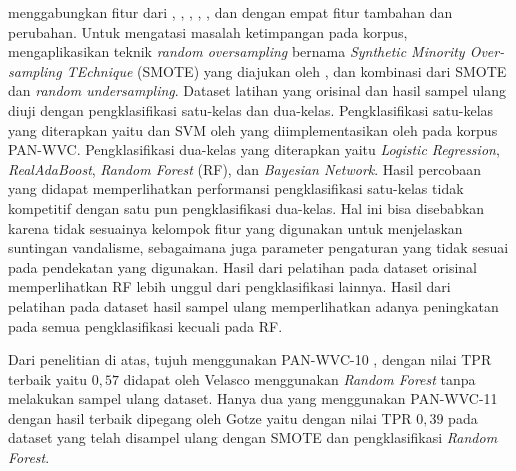\textcite{gotze2014advanced} menggabungkan fitur dari
\textcite{adler2011wikipedia},
\textcite{javanmardi2011vandalism},
\textcite{mola2012wikipedia},
\textcite{potthast2008automatic},
\textcite{wang2010got}, dan
\textcite{west2011multilingual} dengan empat fitur tambahan dan perubahan.
Untuk mengatasi masalah ketimpangan pada korpus,
\textcite{gotze2014advanced}
mengaplikasikan teknik
\textit{random oversampling}
bernama
\textit{Synthetic Minority Over-sampling TEchnique} (SMOTE)
yang diajukan oleh
\textcite{chawla2002smote},
dan kombinasi dari SMOTE dan
\textit{random undersampling}.
Dataset latihan yang orisinal dan hasil sampel ulang diuji dengan
pengklasifikasi satu-kelas dan dua-kelas.
Pengklasifikasi satu-kelas yang diterapkan yaitu
\textcite{hempstalk2008one}
dan SVM oleh
\textcite{scholkopf1999support}
yang diimplementasikan oleh
\textcite{chang2011libsvm}
pada korpus PAN-WVC.
Pengklasifikasi dua-kelas yang diterapkan yaitu
\textit{Logistic Regression},
\textit{RealAdaBoost},
\textit{Random Forest} (RF), dan
\textit{Bayesian Network}.
Hasil percobaan yang didapat memperlihatkan performansi pengklasifikasi
satu-kelas tidak kompetitif dengan satu pun pengklasifikasi dua-kelas.
Hal ini bisa disebabkan karena tidak sesuainya kelompok fitur yang digunakan
untuk menjelaskan suntingan vandalisme, sebagaimana juga parameter pengaturan
yang tidak sesuai pada pendekatan yang digunakan.
Hasil dari pelatihan pada dataset orisinal memperlihatkan RF
lebih unggul dari pengklasifikasi lainnya.
Hasil dari pelatihan pada dataset hasil sampel ulang memperlihatkan adanya
peningkatan pada semua pengklasifikasi kecuali pada RF.

\pagebreak
Dari penelitian di atas, tujuh menggunakan PAN-WVC-10
\parencites{adler2010detecting}
{adler2011wikipedia}
{gotze2014advanced}
{harpalani2011language}
{mola2012wikipedia}
{wang2010got}
{west2011multilingual},
dengan nilai TPR terbaik yaitu $0,57$
didapat oleh Velasco menggunakan \textit{Random Forest} tanpa
melakukan sampel ulang dataset.
Hanya dua yang menggunakan PAN-WVC-11
\parencites{gotze2014advanced}
{west2011multilingual}
dengan hasil terbaik dipegang oleh Gotze yaitu
dengan nilai TPR $0,39$ pada dataset yang telah disampel ulang dengan SMOTE dan
pengklasifikasi \textit{Random Forest}.
